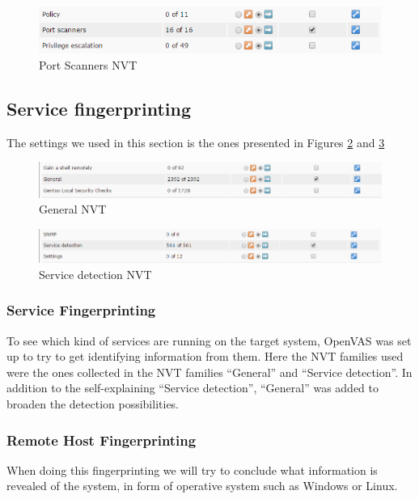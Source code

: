 \begin{figure}[htb]
  \centering
  \includegraphics[scale=.4]{figures/port_nvt}
  \caption{Port Scanners NVT} \label{fig:portscanners}
\end{figure}

\newpage

\subsection{Service fingerprinting}
\label{sub:finger_set}
The settings we used in this section is the ones presented in Figures \ref{fig:general} and \ref{fig:service}

\begin{figure}[b!]
  \centering
  \includegraphics[scale=.4]{figures/general_nvt}
  \caption{General NVT} \label{fig:general}
\end{figure}

\begin{figure}[b!]
  \centering
  \includegraphics[scale=.4]{figures/service_nvt}
  \caption{Service detection NVT} \label{fig:service}
\end{figure}

\subsubsection{Service Fingerprinting}
To see which kind of services are running on the target system, OpenVAS was set up to try to get identifying information from them. Here the NVT families used were the ones collected in the NVT families “General” and “Service detection”. In addition to the self-explaining “Service detection”, “General” was added to broaden the detection possibilities.

\subsubsection{Remote Host Fingerprinting}
When doing this fingerprinting we will try to conclude what information is revealed of the system, in form of operative system such as Windows or Linux. 


